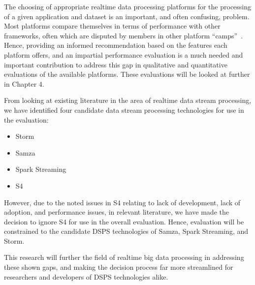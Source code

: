 The choosing of appropriate realtime data processing platforms for the processing of a given application and dataset
is an important, and often confusing, problem. Most platforms compare themselves in terms of performance with other
frameworks, often which are disputed by members in other platform ``camps''~\cite{web_slideshare_b,web_slideshare_a}.
Hence, providing an informed recommendation based on the features each platform offers, and an impartial performance
evaluation is a much needed and important contribution to address this gap in qualitative and quantitative evaluations
of the available platforms. These evaluations will be looked at further in Chapter 4.

From looking at existing literature in the area of realtime data stream processing, we have identified four candidate
data stream processing technologies for use in the evaluation:
\begin{itemize}
  \item Storm
  \item Samza
  \item Spark Streaming
  \item S4
\end{itemize}
However, due to the noted issues in S4 relating to lack of development, lack of adoption, and performance issues, in relevant
literature, we have made the decision to ignore S4 for use in the overall evaluation. Hence, evaluation will be constrained
to the candidate DSPS technologies of Samza, Spark Streaming, and Storm.

This research will further the field of realtime big data processing in addressing these shown gaps, and making the
decision process far more streamlined for researchers and developers of DSPS technologies alike.


